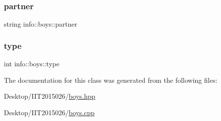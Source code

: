 \mbox{\label{classinfo_1_1boys_a650dc47ff63c486af4c4e722d7335e80}} 
\subsubsection{\texorpdfstring{partner}{partner}}
{\footnotesize\ttfamily string info\+::boys\+::partner\hspace{0.3cm}{\ttfamily [private]}}

\mbox{\label{classinfo_1_1boys_afc46ebbbf8a5e80edbf86fecd5893590}} 
\subsubsection{\texorpdfstring{type}{type}}
{\footnotesize\ttfamily int info\+::boys\+::type\hspace{0.3cm}{\ttfamily [private]}}



The documentation for this class was generated from the following files\+:\begin{DoxyCompactItemize}
\item 
Desktop/\+I\+I\+T2015026/\hyperlink{boys_8hpp}{boys.\+hpp}\item 
Desktop/\+I\+I\+T2015026/\hyperlink{boys_8cpp}{boys.\+cpp}\end{DoxyCompactItemize}
